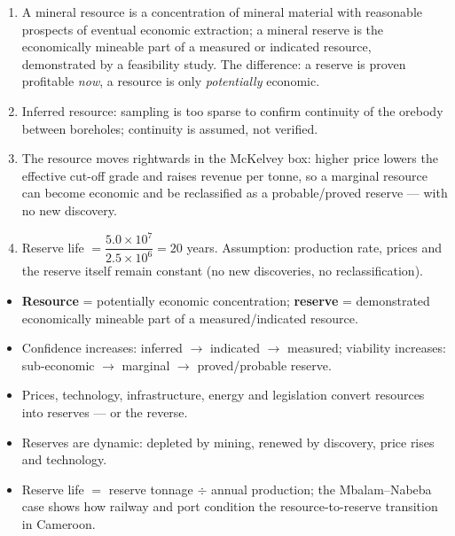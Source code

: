 \documentclass[11pt]{article}
\begin{document}
\begin{corrige}[Exercise 1]
\begin{enumerate}
\item A mineral resource is a concentration of mineral material with reasonable prospects of eventual economic extraction; a mineral reserve is the economically mineable part of a measured or indicated resource, demonstrated by a feasibility study. The difference: a reserve is proven profitable \emph{now}, a resource is only \emph{potentially} economic.
\item Inferred resource: sampling is too sparse to confirm continuity of the orebody between boreholes; continuity is assumed, not verified.
\item The resource moves rightwards in the McKelvey box: higher price lowers the effective cut-off grade and raises revenue per tonne, so a marginal resource can become economic and be reclassified as a probable/proved reserve --- with no new discovery.
\item Reserve life $= \dfrac{5.0 \times 10^{7}}{2.5 \times 10^{6}} = 20$ years. Assumption: production rate, prices and the reserve itself remain constant (no new discoveries, no reclassification).
\end{enumerate}
\end{corrige}

\begin{aretenir}
\begin{itemize}
\item \textbf{Resource} = potentially economic concentration; \textbf{reserve} = demonstrated economically mineable part of a measured/indicated resource.
\item Confidence increases: inferred $\rightarrow$ indicated $\rightarrow$ measured; viability increases: sub-economic $\rightarrow$ marginal $\rightarrow$ proved/probable reserve.
\item Prices, technology, infrastructure, energy and legislation convert resources into reserves --- or the reverse.
\item Reserves are dynamic: depleted by mining, renewed by discovery, price rises and technology.
\item Reserve life $=$ reserve tonnage $\div$ annual production; the Mbalam--Nabeba case shows how railway and port condition the resource-to-reserve transition in Cameroon.
\end{itemize}
\end{aretenir}
\end{document}
